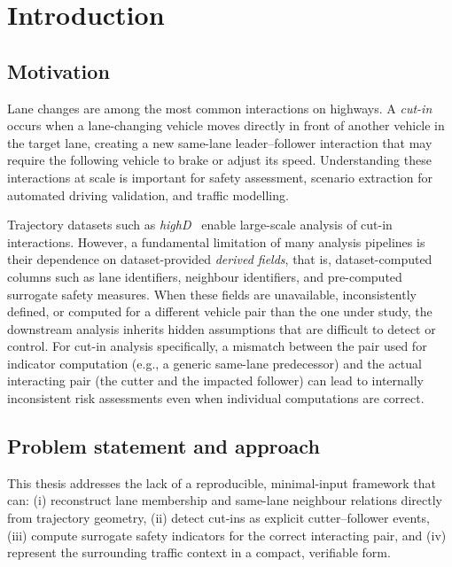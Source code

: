 \documentclass[12pt,a4paper,twoside,openright]{report}
\begin{document}
    \cleardoublepage
    \setcounter{page}{1}
    \onehalfspacing

    \chapter{Introduction}
    \label{chap:introduction}

    \section{Motivation}
    Lane changes are among the most common interactions on highways. A \emph{cut-in} occurs when a lane-changing vehicle moves directly in front of another vehicle in the target lane, creating a new same-lane leader--follower interaction that may require the following vehicle to brake or adjust its speed. Understanding these interactions at scale is important for safety assessment, scenario extraction for automated driving validation, and traffic modelling.

    Trajectory datasets such as \textit{highD}~\cite{highd_2018} enable large-scale analysis of cut-in interactions. However, a fundamental limitation of many analysis pipelines is their dependence on dataset-provided \emph{derived fields}, that is, dataset-computed columns such as lane identifiers, neighbour identifiers, and pre-computed surrogate safety measures. When these fields are unavailable, inconsistently defined, or computed for a different vehicle pair than the one under study, the downstream analysis inherits hidden assumptions that are difficult to detect or control. For cut-in analysis specifically, a mismatch between the pair used for indicator computation (e.g., a generic same-lane predecessor) and the actual interacting pair (the cutter and the impacted follower) can lead to internally inconsistent risk assessments even when individual computations are correct.

    \section{Problem statement and approach}
    This thesis addresses the lack of a reproducible, minimal-input framework that can: (i) reconstruct lane membership and same-lane neighbour relations directly from trajectory geometry, (ii) detect cut-ins as explicit cutter--follower events, (iii) compute surrogate safety indicators for the correct interacting pair, and (iv) represent the surrounding traffic context in a compact, verifiable form.
\end{document}
